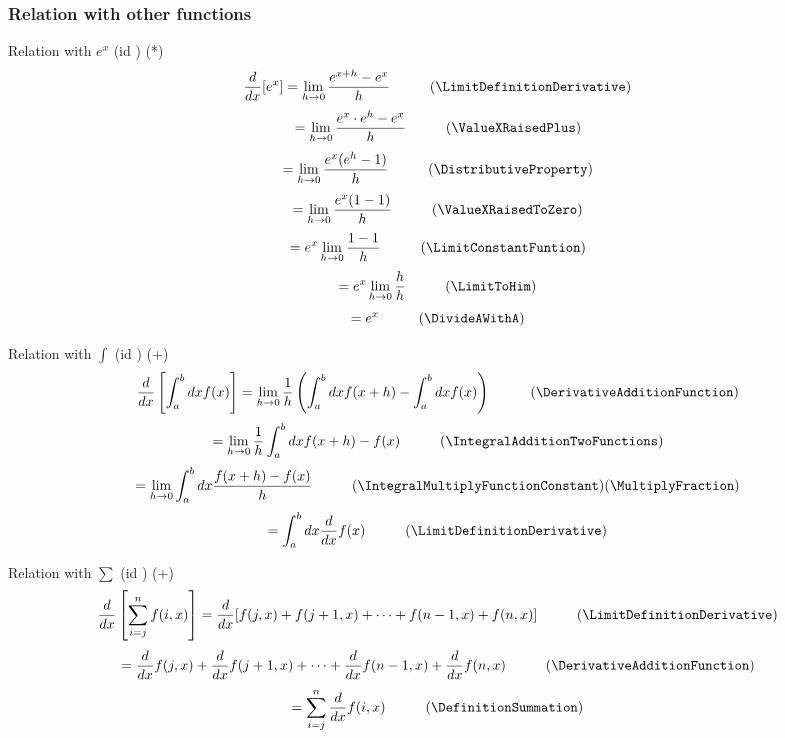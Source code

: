 \documentclass{book}
\begin{document}
                \subsubsection{Relation with other functions}
                    Relation with $e^x$ (id \DerivateRelationEX) (*)
                    \[\frac{d}{dx}[e^x] = \lim_{h \rightarrow 0} \frac{e^{x + h} - e^x}{h} \hspace{1cm} (\LimitDefinitionDerivative)\]
                    \[= \lim_{h \rightarrow 0} \frac{e^x \cdot e^h - e^x}{h} \hspace{1cm} (\ValueXRaisedPlus)\]
                    \[= \lim_{h \rightarrow 0} \frac{e^x (e^h - 1)}{h} \hspace{1cm} (\DistributiveProperty)\]
                    \[= \lim_{h \rightarrow 0} \frac{e^x(1 - 1)}{h} \hspace{1cm} (\ValueXRaisedToZero)\]
                    \[= e^x \lim_{h \rightarrow 0} \frac{1 - 1}{h} \hspace{1cm} (\LimitConstantFuntion)\]
                    \[= e^x \lim_{h \rightarrow 0} \frac{h}{h} \hspace{1cm} (\LimitToHim)\]
                    \[= e^x \hspace{1cm} (\DivideAWithA)\]

                    Relation with $\int$ (id \DerivationRelationIntegral) (+)
                    \[\frac{d}{dx} \left[\int^b_a dx f(x) \right] = \lim_{h \rightarrow 0} \frac{1}{h} \left(\int^b_a dx f(x + h) - \int^b_a dx f(x) \right) \hspace{1cm} (\DerivativeAdditionFunction)\]
                    \[= \lim_{h \rightarrow 0} \frac{1}{h} \int^b_a dx f(x + h) - f(x) \hspace{1cm} (\IntegralAdditionTwoFunctions)\]
                    \[= \lim_{h \rightarrow 0} \int^b_a dx \frac{f(x + h) - f(x)}{h} \hspace{1cm} (\IntegralMultiplyFunctionConstant)(\MultiplyFraction)\]
                    \[= \int^b_a dx \frac{d}{dx} f(x) \hspace{1cm} (\LimitDefinitionDerivative)\]

                    Relation with $\sum$ (id \DerivateRelationSummation) (+)
                    \[\frac{d}{dx} \left[\sum^n_{i=j} f(i, x) \right] = \frac{d}{dx} [f(j, x) + f(j + 1, x) + \cdots + f(n - 1, x) + f(n, x)] \hspace{1cm} (\LimitDefinitionDerivative)\]
                    \[= \frac{d}{dx} f(j, x) + \frac{d}{dx} f(j + 1, x) + \cdots + \frac{d}{dx} f(n - 1, x) + \frac{d}{dx} f(n, x) \hspace{1cm} (\DerivativeAdditionFunction)\]
                    \[= \sum^n_{i=j} \frac{d}{dx} f(i, x) \hspace{1cm} (\DefinitionSummation)\]
                
\end{document}
